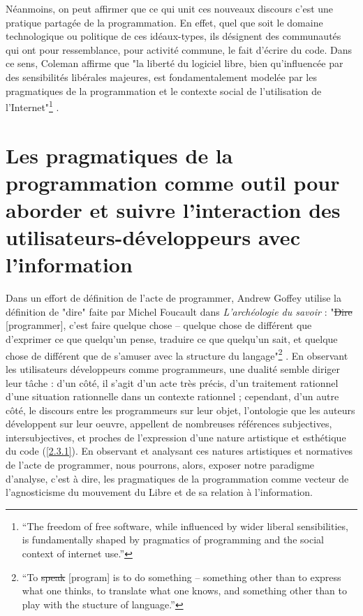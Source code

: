 Néanmoins, on peut affirmer que ce qui unit ces nouveaux discours c'est une pratique partagée de la programmation. En effet, quel que soit le domaine technologique ou politique de ces idéaux-types, ils désignent des communautés qui ont pour ressemblance, pour activité commune, le fait d'écrire du code. Dans ce sens, Coleman affirme que "la liberté du logiciel libre, bien qu'influencée par des sensibilités libérales majeures, est fondamentalement modelée par les pragmatiques de la programmation et le contexte social de l'utilisation de l'Internet"\footnote{“The freedom of free software, while influenced by wider liberal sensibilities, is fundamentally shaped by pragmatics of programming and the social context of internet use.”} \citep[p.509]{Coleman2004a}.

\section{Les pragmatiques de la programmation comme outil pour aborder et suivre l'interaction des utilisateurs-développeurs avec l'information} \label{2.3}

Dans un effort de définition de l'acte de programmer, Andrew Goffey utilise la définition de "dire" faite par Michel Foucault dans \emph{L'archéologie du savoir} : "\st{Dire} [programmer], c'est faire quelque chose -- quelque chose de différent que d'exprimer ce que quelqu'un pense, traduire ce que quelqu'un sait, et quelque chose de différent que de s'amuser avec la structure du langage"\footnote{“To \st{speak} [program] is to do something – something other than to express what one thinks, to translate what one knows, and something other than to play with the stucture of language.”} \citep[p.14]{Goffey2008}. En observant les utilisateurs développeurs comme programmeurs, une dualité semble diriger leur tâche : d'un côté, il s'agit d'un acte très précis, d'un traitement rationnel d'une situation rationnelle dans un contexte rationnel ; cependant, d'un autre côté, le discours entre les programmeurs sur leur objet, l'ontologie que les auteurs développent sur leur oeuvre, appellent de nombreuses références subjectives, intersubjectives, et proches de l'expression d'une nature artistique et esthétique du code (\ref{2.3.1}). En  observant et analysant ces natures artistiques et normatives de l'acte de programmer, nous pourrons, alors, exposer notre paradigme d'analyse, c'est à dire, les pragmatiques de la programmation comme vecteur de l'agnosticisme du mouvement du Libre et de sa relation à l'information.


